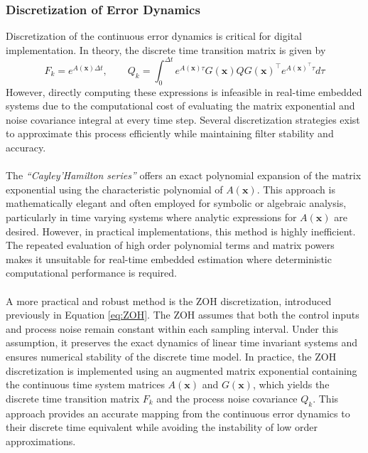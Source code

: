 \subsubsection{Discretization of Error Dynamics}
Discretization of the continuous error dynamics is critical for digital implementation. In theory, the discrete time transition matrix is given by
\begin{equation}
    F_k = e^{A(\mathbf{x})\Delta t}, \qquad
    Q_k = \int_0^{\Delta t} e^{A(\mathbf{x})\tau} G(\mathbf{x}) Q G(\mathbf{x})^\top e^{A(\mathbf{x})^\top\tau} d\tau
    \label{eq:state-estimation-error-state-dynamics-discretized}
\end{equation}
However, directly computing these expressions is infeasible in real-time embedded systems due to the computational cost of evaluating the matrix exponential and noise covariance integral at every time step. Several discretization strategies exist to approximate this process efficiently while maintaining filter stability and accuracy.  
\\ \\
The \textit{``Cayley'Hamilton series''} offers an exact polynomial expansion of the matrix exponential using the characteristic polynomial of $A(\mathbf{x})$. This approach is mathematically elegant and often employed for symbolic or algebraic analysis, particularly in time varying systems where analytic expressions for $A(\mathbf{x})$ are desired. However, in practical implementations, this method is highly inefficient. The repeated evaluation of high order polynomial terms and matrix powers makes it unsuitable for real-time embedded estimation where deterministic computational performance is required.  
\\ \\
A more practical and robust method is the ZOH discretization, introduced previously in Equation \ref{eq:ZOH}. The ZOH assumes that both the control inputs and process noise remain constant within each sampling interval. Under this assumption, it preserves the exact dynamics of linear time invariant systems and ensures numerical stability of the discrete time model. In practice, the ZOH discretization is implemented using an augmented matrix exponential containing the continuous time system matrices $A(\mathbf{x})$ and $G(\mathbf{x})$, which yields the discrete time transition matrix $F_k$ and the process noise covariance $Q_k$. This approach provides an accurate mapping from the continuous error dynamics to their discrete time equivalent while avoiding the instability of low order approximations.  
